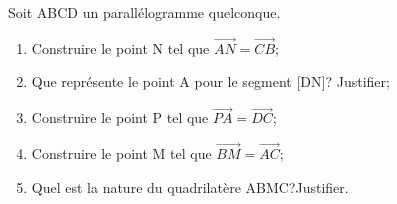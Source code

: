 \begin{exercice}
Soit ABCD un parallélogramme quelconque.
\begin{enumerate}
\item Construire le point N tel que $\overrightarrow{AN}=\overrightarrow{CB}$;
\item Que représente le point A pour le segment [DN]? Justifier;
\item Construire le point P tel que $\overrightarrow{PA}=\overrightarrow{DC}$;
\item Construire le point M tel que $\overrightarrow{BM}=\overrightarrow{AC}$;
\item Quel est la nature du quadrilatère ABMC?Justifier.
\end{enumerate}
\end{exercice}




